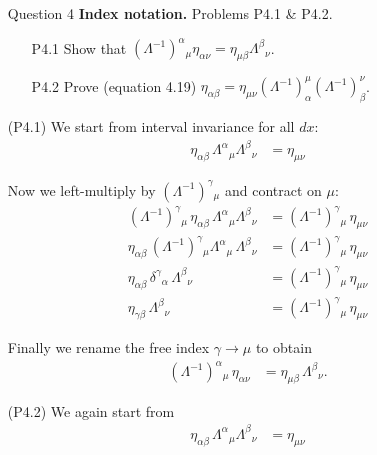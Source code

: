\documentclass[12pt]{article}
\begin{document}
\begin{enumerate}
  \newpage

  \item[Question 4] \textbf{Index notation.} Problems P4.1 \& P4.2.
  \begin{enumerate}
    \item[P4.1]
    Show that $\left(\Lambda^{-1}\right)^\alpha{ }_\mu \eta_{\alpha \nu}=\eta_{\mu \beta} \Lambda^\beta{ }_\nu$.
    \item[P4.2]
    Prove (equation 4.19) $\eta_{\alpha \beta}=\eta_{\mu \nu}\left(\Lambda^{-1}\right)_\alpha^\mu\left(\Lambda^{-1}\right)_\beta^\nu$.
  \end{enumerate}
  
  \item[(P4.1)] We start from interval invariance for all $dx$:  
  \[
  \begin{aligned}
  \eta_{\alpha\beta}\,\Lambda^{\alpha}{}_{\mu}\Lambda^{\beta}{}_{\nu} &= \eta_{\mu\nu}
  \end{aligned}
  \]
  
  Now we left-multiply by $(\Lambda^{-1})^{\gamma}{}_{\mu}$ and contract on $\mu$:  
  \[
  \begin{aligned}
  (\Lambda^{-1})^{\gamma}{}_{\mu}\,\eta_{\alpha\beta}\,\Lambda^{\alpha}{}_{\mu}\Lambda^{\beta}{}_{\nu}
  &=(\Lambda^{-1})^{\gamma}{}_{\mu}\,\eta_{\mu\nu} \\[4pt]
  \eta_{\alpha\beta}\,(\Lambda^{-1})^{\gamma}{}_{\mu}\Lambda^{\alpha}{}_{\mu}\,\Lambda^{\beta}{}_{\nu}
  &=(\Lambda^{-1})^{\gamma}{}_{\mu}\,\eta_{\mu\nu} \\[4pt]
  \eta_{\alpha\beta}\,\delta^{\gamma}{}_{\alpha}\,\Lambda^{\beta}{}_{\nu}
  &=(\Lambda^{-1})^{\gamma}{}_{\mu}\,\eta_{\mu\nu} \\[4pt]
  \eta_{\gamma\beta}\,\Lambda^{\beta}{}_{\nu}
  &=(\Lambda^{-1})^{\gamma}{}_{\mu}\,\eta_{\mu\nu}
  \end{aligned}
  \]
  
  Finally we rename the free index $\gamma\to\mu$ to obtain
  \[
  \begin{aligned}
  (\Lambda^{-1})^{\alpha}{}_{\mu}\,\eta_{\alpha\nu}
  &=\eta_{\mu\beta}\,\Lambda^{\beta}{}_{\nu}.
  \end{aligned}
  \]
  
  \item[(P4.2)] We again start from
  \[
  \begin{aligned}
  \eta_{\alpha\beta}\,\Lambda^{\alpha}{}_{\mu}\Lambda^{\beta}{}_{\nu} &= \eta_{\mu\nu}
  \end{aligned}
  \]
  

\end{enumerate}
\end{document}
